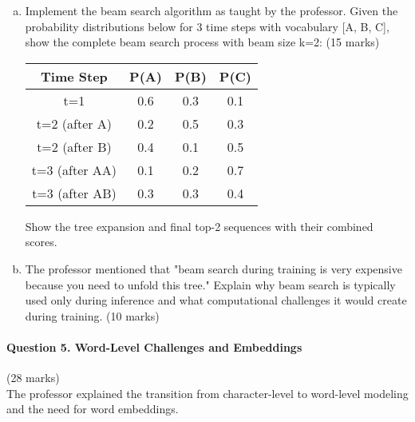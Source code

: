 \documentclass[12pt]{article}
\newcommand{\mediumanswer}{\vspace{3cm}}
\newcommand{\codespace}{\vspace{5cm}}
\begin{document}
\begin{enumerate}[(a)]
    \item Implement the beam search algorithm as taught by the professor. Given the probability distributions below for 3 time steps with vocabulary [A, B, C], show the complete beam search process with beam size k=2: \hfill (15 marks)
    
    \begin{center}
    \begin{tabular}{|c|c|c|c|}
    \hline
    Time Step & P(A) & P(B) & P(C) \\
    \hline
    t=1 & 0.6 & 0.3 & 0.1 \\
    t=2 (after A) & 0.2 & 0.5 & 0.3 \\
    t=2 (after B) & 0.4 & 0.1 & 0.5 \\
    t=3 (after AA) & 0.1 & 0.2 & 0.7 \\
    t=3 (after AB) & 0.3 & 0.3 & 0.4 \\
    \hline
    \end{tabular}
    \end{center}
    
    Show the tree expansion and final top-2 sequences with their combined scores.
    
    \codespace
    
    \item The professor mentioned that "beam search during training is very expensive because you need to unfold this tree." Explain why beam search is typically used only during inference and what computational challenges it would create during training. \hfill (10 marks)
    
    \mediumanswer
\end{enumerate}

\newpage
\paragraph{Question 5. Word-Level Challenges and Embeddings}\hfill (28 marks)\\
The professor explained the transition from character-level to word-level modeling and the need for word embeddings.
\end{document}
